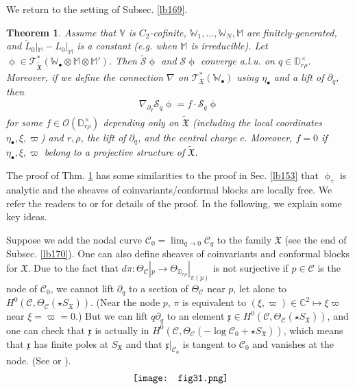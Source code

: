 \documentclass[12pt,a4paper,notitlepage]{article}
\theoremstyle{definition}
\theoremstyle{plain}
\newtheorem{thm}[df]{Theorem}
\newcommand{\fk}{\mathfrak}
\newcommand{\mc}{\mathcal}
\newcommand{\wtd}{\widetilde}
\newcommand{\scr}{\mathscr}
\newcommand{\xk}{\mathfrak x}
\newcommand{\SX}{{S_{\fk X}}}
\newcommand{\blt}{\bullet}
\newcommand{\Vbb}{\mathbb V}
\newcommand{\Wbb}{\mathbb W}
\newcommand{\Mbb}{\mathbb M}
\newcommand{\Cbb}{\mathbb C}
\newcommand{\Dbb}{\mathbb D}
\numberwithin{equation}{section}
\begin{document}
We return to the setting of Subsec. \ref{lb169}.
\begin{thm}\label{lb171}
Assume that $\Vbb$ is $C_2$-cofinite,  $\Wbb_1,\dots,\Wbb_N,\Mbb$ are finitely-generated, and $\wtd L_0|_\Mbb-L_0|_\Mbb$ is a constant (e.g. when $\Mbb$ is irreducible). Let $\upphi\in\scr T^*_{\wtd{\fk X}}(\Wbb_\blt\otimes\Mbb\otimes\Mbb')$. Then $\wtd{\mc S}\upphi$ and $\mc S\upphi$ converge a.l.u. on $q\in\Dbb_{r\rho}^\times$. Moreover, if we define the connection $\nabla$ on $\scr T_{\fk X}^*(\Wbb_\blt)$ using $\eta_\blt$ and a lift of $\partial_q$, then
\begin{align}
\nabla_{\partial_q}\mc S_q\upphi=f\cdot\mc S_q\upphi
\end{align}
for some $f\in\scr O(\Dbb_{r\rho}^\times)$ depending only on $\wtd{\fk X}$ (including the local coordinates $\eta_\blt,\xi,\varpi$) and $r,\rho$, the lift of $\partial_q$, and the central charge $c$. Moreover, $f=0$  if $\eta_\blt,\xi,\varpi$ belong to a projective structure of $\wtd{\fk X}$.
\end{thm}

The proof of Thm. \ref{lb171} has some similarities to the proof in Sec. \ref{lb153} that  $\upphi_\tau$ is analytic and the sheaves of coinvariants/conformal blocks are locally free. We refer the readers to \cite[Sec. 4.3]{Gui} or \cite[Sec. 11]{Gui20} for details of the proof. In the following, we explain some key ideas.

Suppose we add the nodal curve $\mc C_0=\lim_{q\rightarrow 0}\mc C_q$ to the family $\fk X$ (see the end of Subsec. \ref{lb170}). One can also define sheaves of coinvariants and conformal blocks for $\fk X$. Due to the fact that $d\pi:\Theta_{\mc C}|_p\rightarrow \Theta_{\Dbb_{r\rho}}|_{\pi(p)}$ is not surjective if $p\in\mc C$ is the node of $\mc C_0$, we cannot lift $\partial_q$ to a section of $\Theta_{\mc C}$ near $p$, let alone to  $H^0(\mc C,\Theta_{\mc C}(\star\SX))$. (Near the node $p$, $\pi$ is equivalent to $(\xi,\varpi)\in\Cbb^2\mapsto \xi\varpi$ near $\xi=\varpi=0$.) But we can lift $q\partial_q$ to an element $\xk\in H^0(\mc C,\Theta_{\mc C}(\star\SX))$, and one can check that $\xk$ is actually in $ H^0(\mc C,\Theta_{\mc C}(-\log\mc C_0+\star\SX))$, which means that $\xk$ has finite poles at $\SX$ and that $\xk|_{\mc C_0}$ is tangent to $\mc C_0$ and vanishes at the node. (See \cite[Sec. 3.6]{Gui} or \cite[Sec. 11]{Gui20}). 
\begin{align}
\vcenter{\hbox{{
\texttt{[image: fig31.png]}}}}
\end{align}
\end{document}
